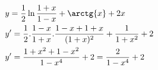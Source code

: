 \begin{ex}
\begin{align}
&y=\frac{1}{2}\ln{\frac{1+x}{1-x}}+\arctg{x}+2x\nonumber\\
&y'=\frac{1}{2}.\frac{1-x}{1+x}.\frac{1-x+1+x}{(1+x)^2}+\frac{1}{1+x^2}+2\nonumber\\
&y'=\frac{1+x^2+1-x^2}{1-x^4}+2=\frac{2}{1-x^4}+2\nonumber
\end{align}
\end{ex}
